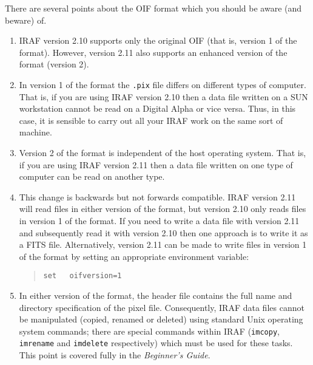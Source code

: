 \documentclass[twoside,11pt]{article}
\begin{document}
There are several points about the OIF format which you should be aware
(and beware) of.

\begin{enumerate}

  \item IRAF version 2.10 supports only the original OIF (that is, version 1
   of the format).  However, version 2.11 also supports an enhanced version
   of the format (version 2).

  \item In version 1 of the format the {\tt .pix} file differs on
   different types of computer.  That is, if you are using IRAF version
   2.10 then a data file written on a SUN workstation cannot be read on a
   Digital Alpha or vice versa.  Thus, in this case, it is sensible to carry
   out all your IRAF work on the same sort of machine.

  \item Version 2 of the format is independent of the host operating
   system.  That is, if you are using IRAF version 2.11 then a data file
   written on one type of computer can be read on another type.

  \item This change is backwards but not forwards compatible.  IRAF version
   2.11 will read files in either version of the format, but version 2.10
   only reads files in version 1 of the format.  If you need to write a
   data file with version 2.11 and subsequently read it with version
   2.10 then one approach is to write it as a FITS file.  Alternatively,
   version 2.11 can be made to write files in version 1 of the format by
   setting an appropriate environment variable:

  \begin{quote}
   {\tt set ~ oifversion=1}
  \end{quote}

  \item In either version of the format, the header file contains the full
   name and directory specification of the pixel file.  Consequently, IRAF
   data files cannot be manipulated (copied, renamed or deleted) using
   standard Unix operating system commands; there are special commands
   within IRAF ({\tt imcopy}, {\tt imrename} and {\tt imdelete} respectively)
   which must be used for these tasks.  This point is covered fully in the
   {\it Beginner's Guide}\/\cite{BARNES93}.

\end{enumerate}
\end{document}
